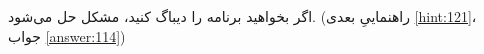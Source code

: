 \section{}
\paragraph{}\label{hint:256}
اگر بخواهید برنامه را دیباگ کنید، مشکل حل می‌شود. (راهنماییِ بعدی \ref{hint:121}، جواب \ref{answer:114})
